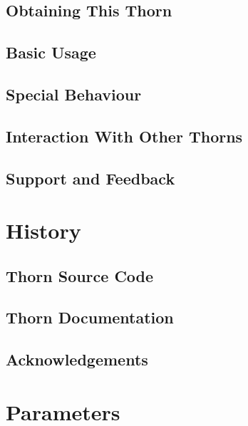 \subsection{Obtaining This Thorn}

\subsection{Basic Usage}

\subsection{Special Behaviour}

\subsection{Interaction With Other Thorns}

\subsection{Support and Feedback}

\section{History}

\subsection{Thorn Source Code}

\subsection{Thorn Documentation}

\subsection{Acknowledgements}


\begin{thebibliography}{9}

\end{thebibliography}




\section{Parameters} 


